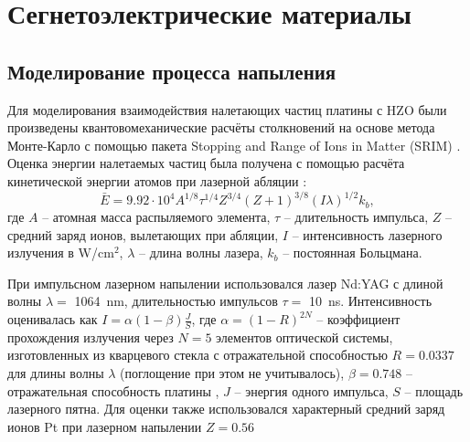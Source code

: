 \chapter{Сегнетоэлектрические материалы}\label{ch:ch3}

\section{Моделирование процесса напыления}\label{sec:ch3/sec2}
Для моделирования взаимодействия налетающих частиц платины с HZO были произведены квантовомеханические расчёты столкновений на основе метода Монте-Карло с помощью пакета Stopping and Range of Ions in Matter (SRIM) \cite{zieglerSRIMStoppingRange2010}. Оценка энергии налетаемых частиц была получена с помощью расчёта кинетической энергии атомов при лазерной абляции \cite{mutaevVLIYaNIEVERHNEYGRANICY2020}:
\[\bar{E} = 9.92 \cdot 10^{4} A^{1/8} \tau^{1/4} Z^{3/4} (Z+1)^{3/8} (I\lambda)^{1/2}k_b,\] где \(A\) -- атомная масса распыляемого элемента, \(\tau\) -- длительность импульса, \(Z\) -- средний заряд ионов, вылетающих при абляции, \(I\) -- интенсивность лазерного излучения в \si{\watt}/\si{\cm}\(^2\), \(\lambda\) -- длина волны лазера, \(k_b\) -- постоянная Больцмана.

При импульсном лазерном напылении использовался лазер Nd:YAG с длиной волны \(\lambda=\) \SI{1064}{\nano\meter}, длительностью импульсов \(\tau=\) \SI{10}{\nano\second}. Интенсивность оценивалась как \(I=\alpha(1-\beta)\frac{J}{S}\), где \(\alpha=(1-R)^{2N}\) -- коэффициент прохождения излучения через \(N=5\) элементов оптической системы, изготовленных из кварцевого стекла с отражательной способностью \(R=0.0337\) \cite{polyanskiyRefractiveindexInfoDatabase2024} для длины волны \(\lambda\) (поглощение при этом не учитывалось), \(\beta=0.748\) -- отражательная способность платины \cite{weberHandbookOpticalMaterials2003}, \(J\) -- энергия одного импульса, \(S\) -- площадь лазерного пятна. Для оценки также использовался характерный средний заряд ионов Pt при лазерном напылении $Z=0.56$ \cite[с.~141]{easonPulsedLaserDeposition2007}

